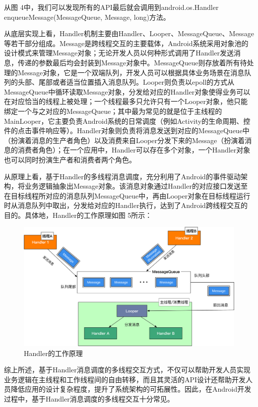 从图 4中，我们可以发现所有的API最后就会调用到android.os.Handler enqueueMessage(MessageQueue, Message, long)方法。

从底层实现上看，Handler机制主要由Handler、Looper、MessageQueue、Message等若干部分组成。Message是跨线程交互的主要载体，Android系统采用对象池的设计模式来管理Message对象；无论开发人员以何种形式调用了Handler发送消息，传递的参数最后均会封装到Message对象中。MessageQueue则存放着所有待处理的Message对象，它是一个双端队列，开发人员可以根据具体业务场景在消息队列的头部、尾部或者适当位置插入消息队列。Looper则负责以epoll的方式从MessageQueue中循环读取Message对象，分发给对应的Handler对象使得业务可以在对应恰当的线程上被处理；一个线程最多只允许只有一个Looper对象，他只能绑定一个与之对应的MessageQueue；其中最为常见的就是位于主线程的MainLooper，它主要负责Android系统的日常调度（例如Activity的生命周期、控件的点击事件响应等）。Handler对象则负责将消息发送到对应的MessageQueue中（扮演着消息的生产者角色）以及消费来自Looper分发下来的Message（扮演着消息的消费者角色）；在一个应用中，Handler可以存在多个对象，一个Handler对象也可以同时扮演生产者和消费者两个角色。

从原理上看，基于Handler的多线程消息调度，充分利用了Android的事件驱动架构，将业务逻辑抽象出Message对象。该消息对象通过Handler的对应接口发送至在目标线程所对应的消息队列MessageQueue中，再由Looper对象在目标线程运行时从消息队列中取出，分发给对应的Handler执行，达到了Android跨线程交互的目的。具体地，Handler的工作原理如图 5所示：
 

 \begin{figure}
	\centering
	\includegraphics[width=\textwidth]{./Figures/Handler-framework.png}
	\caption{ Handler的工作原理}
	\label{fig:handler-framework}
\end{figure}


综上所述，基于Handler消息调度的多线程交互方式，不仅可以帮助开发人员实现业务逻辑在主线程和工作线程间的自由转移，而且其灵活的API设计还帮助开发人员降低应用的设计复杂程度，提升了系统架构的可拓展性。因此，在Android开发过程中，基于Handler消息调度的多线程交互十分常见。
